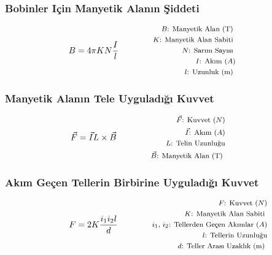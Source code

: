 \subsubsection*{Bobinler Için Manyetik Alanın Şiddeti}
\begin{equation}
    B = 4\pi K  N \frac{I}{l} \qquad \qquad \parbox{4cm}{\footnotesize$\begin{aligned}
        B\text{: Manyetik Alan (T) } \\
        K\text{: Manyetik Alan Sabiti } \\
        N\text{: Sarım Sayısı } \\
        I\text{: Akım } (A) \\
        l\text{: Uzunluk (m) }
\end{aligned}$}
\end{equation}

\subsubsection*{Manyetik Alanın Tele Uyguladığı Kuvvet}
\begin{equation}
    \vec{F} = \vec{I}L \times \vec{B} \qquad \qquad \parbox{4cm}{\footnotesize$\begin{aligned}
        \vec{F}\text{: Kuvvet } (N) \\
        \vec{I}\text{: Akım } (A) \\
        L\text{: Telin Uzunluğu} \\
        \vec{B}\text{: Manyetik Alan (T) }
\end{aligned}$}
\end{equation}

\subsubsection*{Akım Geçen Tellerin Birbirine Uyguladığı Kuvvet}
\begin{equation}
    F = 2K \frac{i_1 i_2 l}{d} \qquad \qquad \parbox{4cm}{\footnotesize$\begin{aligned}
        F\text{: Kuvvet } (N) \\
        K\text{: Manyetik Alan Sabiti } \\
        i_1\text{, }i_2\text{: Tellerden Geçen Akımlar } (A) \\
        l\text{: Tellerin Uzunluğu} \\
        d\text{: Teller Arası Uzaklık (m) }
\end{aligned}$}
\end{equation}

